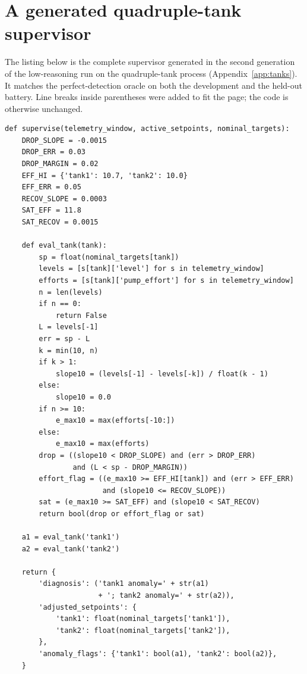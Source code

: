 \chapter{A generated quadruple-tank supervisor}
\label{app:supervisor}
The listing below is the complete supervisor generated in the second
generation of the low-reasoning run on the quadruple-tank process
(Appendix~\ref{app:tanks}). It matches the perfect-detection oracle on both
the development and the held-out battery. Line breaks inside parentheses
were added to fit the page; the code is otherwise unchanged.

{\footnotesize
\begin{verbatim}
def supervise(telemetry_window, active_setpoints, nominal_targets):
    DROP_SLOPE = -0.0015
    DROP_ERR = 0.03
    DROP_MARGIN = 0.02
    EFF_HI = {'tank1': 10.7, 'tank2': 10.0}
    EFF_ERR = 0.05
    RECOV_SLOPE = 0.0003
    SAT_EFF = 11.8
    SAT_RECOV = 0.0015

    def eval_tank(tank):
        sp = float(nominal_targets[tank])
        levels = [s[tank]['level'] for s in telemetry_window]
        efforts = [s[tank]['pump_effort'] for s in telemetry_window]
        n = len(levels)
        if n == 0:
            return False
        L = levels[-1]
        err = sp - L
        k = min(10, n)
        if k > 1:
            slope10 = (levels[-1] - levels[-k]) / float(k - 1)
        else:
            slope10 = 0.0
        if n >= 10:
            e_max10 = max(efforts[-10:])
        else:
            e_max10 = max(efforts)
        drop = ((slope10 < DROP_SLOPE) and (err > DROP_ERR)
                and (L < sp - DROP_MARGIN))
        effort_flag = ((e_max10 >= EFF_HI[tank]) and (err > EFF_ERR)
                       and (slope10 <= RECOV_SLOPE))
        sat = (e_max10 >= SAT_EFF) and (slope10 < SAT_RECOV)
        return bool(drop or effort_flag or sat)

    a1 = eval_tank('tank1')
    a2 = eval_tank('tank2')

    return {
        'diagnosis': ('tank1 anomaly=' + str(a1)
                      + '; tank2 anomaly=' + str(a2)),
        'adjusted_setpoints': {
            'tank1': float(nominal_targets['tank1']),
            'tank2': float(nominal_targets['tank2']),
        },
        'anomaly_flags': {'tank1': bool(a1), 'tank2': bool(a2)},
    }
\end{verbatim}
}
